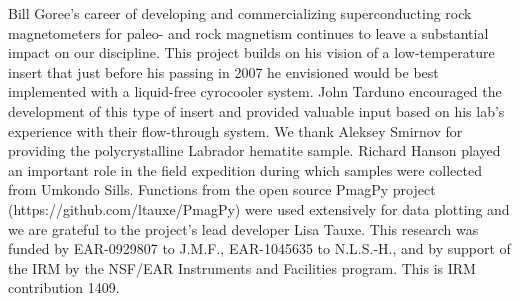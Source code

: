 \documentclass[draft,gc]{AGUTeX}
\begin{document}
\begin{article}
%
%
%
%
%
%
%

\begin{acknowledgments}

Bill Goree's career of developing and commercializing superconducting rock magnetometers for paleo- and rock magnetism continues to leave a substantial impact on our discipline. This project builds on his vision of a low-temperature insert that just before his passing in 2007 he envisioned would be best implemented with a liquid-free cyrocooler system. John Tarduno encouraged the development of this type of insert and provided valuable input based on his lab's experience with their flow-through system. We thank Aleksey Smirnov for providing the polycrystalline Labrador hematite sample. Richard Hanson played an important role in the field expedition during which samples were collected from Umkondo Sills. Functions from the open source PmagPy project (https://github.com/ltauxe/PmagPy) were used extensively for data plotting and we are grateful to the project's lead developer Lisa Tauxe. This research was funded by EAR-0929807 to J.M.F., EAR-1045635 to N.L.S.-H., and by support of the IRM by the NSF/EAR Instruments and Facilities program. This is IRM contribution 1409.


\end{acknowledgments}
\end{article}
\end{document}
